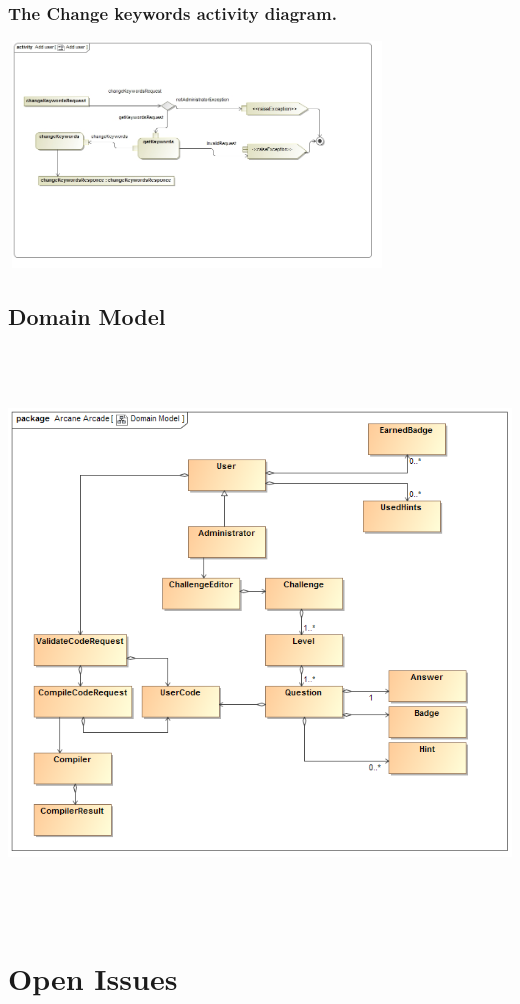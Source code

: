 \documentclass[english]{article}
\begin{document}
		   \subsubsection* {The Change keywords activity diagram.}
		   \includegraphics[width=10cm,height=6cm,keepaspectratio]{ChangeKeywords.jpg}
		 
		 
		 \subsection{Domain Model}
		 \includegraphics[width=15cm,height=15cm,keepaspectratio]{domainModel.png}
			
	\fi
		

	\newpage
	\section{Open Issues}		


		
\end{document}
